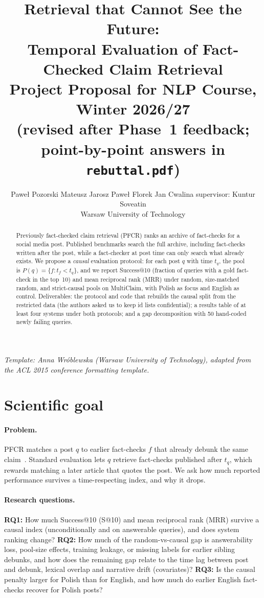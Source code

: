 \documentclass[11pt]{article}
\title{Retrieval that Cannot See the Future:\\
Temporal Evaluation of Fact-Checked Claim Retrieval\\
Project Proposal for NLP Course, Winter 2026/27\\ (revised after Phase~1 feedback; point-by-point answers in \texttt{rebuttal.pdf})}
\author{
  Pawe{\l} Pozorski
  \And
  Mateusz Jarosz
  \AND
  Pawe{\l} Florek
  \And
  Jan Cwalina
  \AND
  supervisor: Kuntur Soveatin \\
  Warsaw University of Technology
}
\date{}
\begin{document}
\maketitle

{\small\em Template: Anna Wr\'oblewska (Warsaw University of Technology), adapted from the ACL 2015 conference formatting template.}
\vspace{4pt}

\begin{abstract}
Previously fact-checked claim retrieval (PFCR) ranks an archive of fact-checks for a social media post.
Published benchmarks search the full archive, including fact-checks written after the post, while a fact-checker at post time can only search what already exists.
We propose a \emph{causal} evaluation protocol: for each post $q$ with time $t_q$, the pool is $P(q)=\{f:t_f<t_q\}$, and we report Success@10 (fraction of queries with a gold fact-check in the top~10) and mean reciprocal rank (MRR) under random, size-matched random, and strict-causal pools on MultiClaim, with Polish as focus and English as control.
Deliverables: the protocol and code that rebuilds the causal split from the restricted data (the authors asked us to keep id lists confidential); a results table of at least four systems under both protocols; and a gap decomposition with 50 hand-coded newly failing queries.
\end{abstract}

\section{Scientific goal}
\label{sec:goal}
\paragraph{Problem.}
PFCR matches a post $q$ to earlier fact-checks $f$ that already debunk the same claim~\cite{shaar2020that,pikuliak2023multilingual}.
Standard evaluation lets $q$ retrieve fact-checks published after $t_q$, which rewards matching a later article that quotes the post.
We ask how much reported performance survives a time-respecting index, and why it drops.

\paragraph{Research questions.}
\textbf{RQ1:} How much Success@10 (S@10) and mean reciprocal rank (MRR) survive a causal index (unconditionally and on answerable queries), and does system ranking change?
\textbf{RQ2:} How much of the random-vs-causal gap is answerability loss, pool-size effects, training leakage, or missing labels for earlier sibling debunks, and how does the remaining gap relate to the time lag between post and debunk, lexical overlap and narrative drift (covariates)?
\textbf{RQ3:} Is the causal penalty larger for Polish than for English, and how much do earlier English fact-checks recover for Polish posts?
\end{document}
